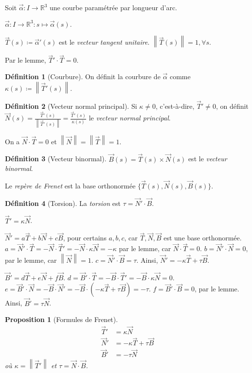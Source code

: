 \documentclass{report}
\newtheorem*{prop}{Proposition}
\theoremstyle{definition}
\newtheorem*{dfn}{D\'efinition}
\theoremstyle{remark}
\def\RR{\mathbb{R}}
\newcommand*{\norme}[1]{\left\|#1\right\|}
\begin{document}
	Soit $\vec\alpha: I \to \RR^3$ une courbe param\'etr\'ee par longueur d'arc.

	$\vec\alpha:I\to\RR^3:s\mapsto\vec\alpha(s)$.

	$\vec T(s) \coloneq \vec\alpha'(s)$ est le \emph{vecteur tangent unitaire}. $\norme{\vec T(s)}=1, \forall s$.

	Par le lemme, $\vec T' \cdot \vec T=0$.

	\begin{dfn}[Courbure]
		On d\'efinit la courbure de $\vec\alpha$ comme $\kappa(s) \coloneq \norme{\vec T'(s)}$.
	\end{dfn}

	\begin{dfn}[Vecteur normal principal]
		Si $\kappa\neq0$, c'est-\`a-dire, $\vec T'\neq0$, on d\'efinit $\vec N(s) = \frac{\vec T'(s)}{\norme{\vec T'(s)}} = \frac{\vec T'(s)}{\kappa(s)}$ le \emph{vecteur normal principal}.
	\end{dfn}

	On a $\vec N \cdot \vec T=0$ et $\norme{\vec N} = \norme{\vec T} = 1$.

	\begin{dfn}[Vecteur binormal]
		$\vec B(s) = \vec T(s) \times \vec N(s)$ est le \emph{vecteur binormal}.
	\end{dfn}

	Le \emph{rep\`ere de Frenet} est la base orthonorm\'ee $\{\vec T(s), \vec N(s), \vec B(s)\}$.

	\begin{dfn}[Torsion]
		La \emph{torsion} est $\tau=\vec N' \cdot \vec B$.
	\end{dfn}

	$\vec T' = \kappa\vec N$.

	$\vec N' = a\vec T+b\vec N+c\vec B$, pour certains $a,b,c$, car $\vec T,\vec N,\vec B$ est une base orthonorm\'ee. $a = \vec N'\cdot\vec T=-\vec N\cdot\vec T' = -\vec N\cdot\kappa\vec N = -\kappa$ par le lemme, car $\vec N\cdot\vec T=0$. $b=\vec N'\cdot\vec N=0$, par le lemme, car $\norme{\vec N}=1$. $c = \vec N'\cdot\vec B = \tau$. Ainsi, $\vec N' = -\kappa\vec T+\tau\vec B$.

	$\vec B' = d\vec T+e\vec N+f\vec B$. $d = \vec B'\cdot\vec T = -\vec B\cdot\vec T' = -\vec B\cdot\kappa\vec N = 0$. $e=\vec B'\cdot\vec N = -\vec B\cdot\vec N' = -\vec B\cdot(-\kappa\vec T+\tau\vec B) = -\tau$. $f = \vec B'\cdot\vec B = 0$, par le lemme. Ainsi, $\vec B'=\tau\vec N$.

	\begin{prop}[Formules de Frenet]
		\begin{align}
			\vec T'&= \kappa\vec N\\
			\vec N'&= -\kappa\vec T+\tau\vec B\\
			\vec B'&= -\tau\vec N
		\end{align}
		o\`u $\kappa=\norme{\vec T'}$ et $\tau=\vec N\cdot\vec B$.
	\end{prop}
\end{document}
